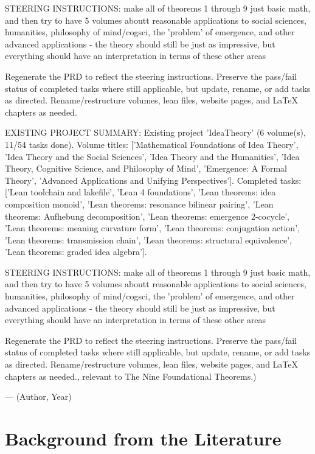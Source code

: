 {STEERING INSTRUCTIONS: make all of theorems 1 through 9 just basic math, and then try to have 5 volumes aboutt reasonable applications to social sciences, humanities, philosophy of mind/cogsci, the 'problem' of emergence, and other advanced applications - the theory should still be just as impressive, but everything should have an interpretation in terms of these other areas

Regenerate the PRD to reflect the steering instructions. Preserve the pass/fail status of completed tasks where still applicable, but update, rename, or add tasks as directed. Rename/restructure volumes, lean files, website pages, and LaTeX chapters as needed.

EXISTING PROJECT SUMMARY: Existing project 'IdeaTheory' (6 volume(s), 11/54 tasks done). Volume titles: ['Mathematical Foundations of Idea Theory', 'Idea Theory and the Social Sciences', 'Idea Theory and the Humanities', 'Idea Theory, Cognitive Science, and Philosophy of Mind', 'Emergence: A Formal Theory', 'Advanced Applications and Unifying Perspectives']. Completed tasks: ['Lean toolchain and lakefile', 'Lean 4 foundations', 'Lean theorems: idea composition monoid', 'Lean theorems: resonance bilinear pairing', 'Lean theorems: Aufhebung decomposition', 'Lean theorems: emergence 2-cocycle', 'Lean theorems: meaning curvature form', 'Lean theorems: conjugation action', 'Lean theorems: transmission chain', 'Lean theorems: structural equivalence', 'Lean theorems: graded idea algebra'].

STEERING INSTRUCTIONS: make all of theorems 1 through 9 just basic math, and then try to have 5 volumes aboutt reasonable applications to social sciences, humanities, philosophy of mind/cogsci, the 'problem' of emergence, and other advanced applications - the theory should still be just as impressive, but everything should have an interpretation in terms of these other areas

Regenerate the PRD to reflect the steering instructions. Preserve the pass/fail status of completed tasks where still applicable, but update, rename, or add tasks as directed. Rename/restructure volumes, lean files, website pages, and LaTeX chapters as needed., relevant to The Nine Foundational Theorems.)}{--- (Author, Year)}

        \section{Background from the Literature}
        \label{sec:v1c1.lit}

